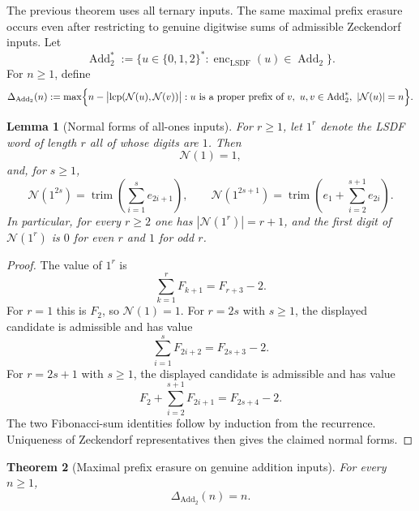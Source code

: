\documentclass[11pt,letterpaper]{article}
\numberwithin{equation}{section}
\theoremstyle{plain}
\newtheorem{theorem}{Theorem}[section]
\newtheorem{lemma}[theorem]{Lemma}
\theoremstyle{definition}
\theoremstyle{remark}
\DeclareMathOperator{\lcp}{lcp}
\newcommand{\encLSDF}{\operatorname{enc}_{\mathrm{LSDF}}}
\newcommand{\AddTwo}{\operatorname{Add}_{2}}
\begin{document}
The previous theorem uses all ternary inputs.  The same maximal prefix erasure
occurs even after restricting to genuine digitwise sums of admissible
Zeckendorf inputs.  Let
\[
\AddTwo^\ast:=\{u\in\{0,1,2\}^\ast:\encLSDF(u)\in\AddTwo\}.
\]
For $n\ge 1$, define
\[
\Delta_{\AddTwo}(n):=
\max\Bigl\{
n-\bigl|\lcp(\mathcal N(u),\mathcal N(v))\bigr|:
u\text{ is a proper prefix of }v,\ u,v\in\AddTwo^\ast,\ |\mathcal N(u)|=n
\Bigr\}.
\]

\begin{lemma}[Normal forms of all-ones inputs]\label{lem:all-ones-normal-forms}
For $r\ge 1$, let $1^r$ denote the LSDF word of length $r$ all of whose
digits are $1$.  Then
\[
\mathcal N(1)=1,
\]
and, for $s\ge 1$,
\[
\mathcal N(1^{2s})=\operatorname{trim}\left(\sum_{i=1}^{s} e_{2i+1}\right),
\qquad
\mathcal N(1^{2s+1})=
\operatorname{trim}\left(e_1+\sum_{i=2}^{s+1}e_{2i}\right).
\]
In particular, for every $r\ge 2$ one has
$|\mathcal N(1^r)|=r+1$, and the first digit of $\mathcal N(1^r)$ is $0$
for even $r$ and $1$ for odd $r$.
\end{lemma}

\begin{proof}
The value of $1^r$ is
\[
\sum_{k=1}^{r}F_{k+1}=F_{r+3}-2.
\]
For $r=1$ this is $F_2$, so $\mathcal N(1)=1$.
For $r=2s$ with $s\ge 1$, the displayed candidate is admissible and has value
\[
\sum_{i=1}^{s}F_{2i+2}=F_{2s+3}-2.
\]
For $r=2s+1$ with $s\ge 1$, the displayed candidate is admissible and has
value
\[
F_2+\sum_{i=2}^{s+1}F_{2i+1}=F_{2s+4}-2.
\]
The two Fibonacci-sum identities follow by induction from the recurrence.
Uniqueness of Zeckendorf representatives then gives the claimed normal forms.
\end{proof}

\begin{theorem}[Maximal prefix erasure on genuine addition inputs]\label{thm:addtwo-prefix-destruction}
For every $n\ge 1$,
\[
\Delta_{\AddTwo}(n)=n.
\]
\end{theorem}
\end{document}
